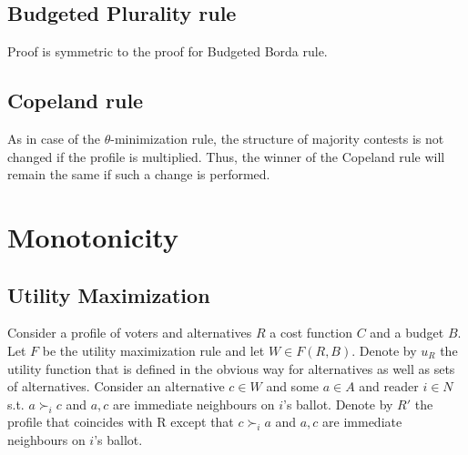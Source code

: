 \documentclass{article}
\begin{document}
\subsection{Budgeted Plurality rule}
Proof is symmetric to the proof for Budgeted Borda rule. 
\subsection{Copeland rule}
As in case of the $\theta$-minimization rule, the structure of majority contests is not changed if the profile is multiplied. Thus, the winner of the Copeland rule will remain the same if such a change is performed.
\section{Monotonicity}

\subsection{Utility Maximization}

Consider a profile of voters and alternatives $R$ a cost function $C$ and a budget $B$. Let $F$ be the utility maximization rule and let $W\in F(R,B)$. Denote by $u_R$ the utility function that is defined in the obvious way for alternatives as well as sets of alternatives. Consider an alternative $c\in W$ and some $a\in A$ and reader $i\in N$  s.t. $a\succ_i c$ and $a,c$ are immediate neighbours on $i$'s ballot. Denote by $R'$ the profile that coincides with R except that $c\succ_i a$ and $a,c$ are immediate neighbours on $i$'s ballot.
\end{document}
